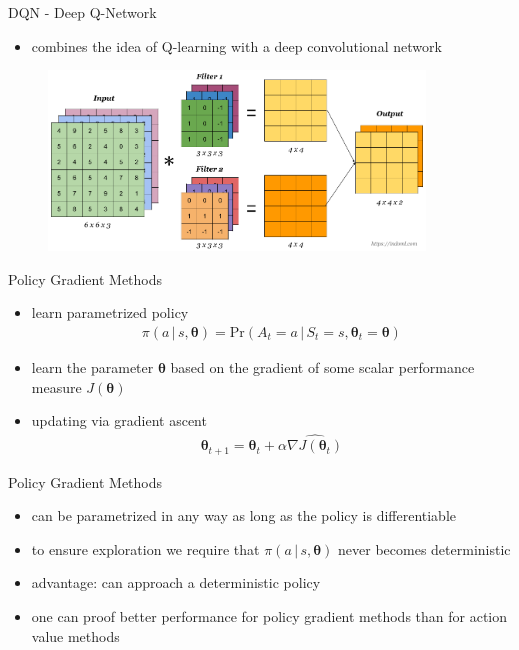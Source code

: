 \documentclass{beamer}
\begin{document}
\begin{frame}{DQN - Deep Q-Network}
\pause
\begin{itemize}
\item combines the idea of Q-learning with a deep convolutional network
\end{itemize}

\centering
\begin{figure}
\includegraphics[width = 10cm]{Images/convolution-with-multiple-filters2.png}
\end{figure}
\end{frame}
\begin{frame}{Policy Gradient Methods}
\pause
  \begin{itemize}
\item {learn parametrized policy
\begin{align*}
\pi(a\, |\, s, \boldsymbol{\theta}) = \mathrm{Pr}(A_t = a\,|\, S_t= s, \boldsymbol{\theta}_t = \boldsymbol{\theta})
\end{align*}}
\pause
\item learn the parameter $\boldsymbol{\theta}$ based on the gradient of some scalar performance measure $J(\boldsymbol{\theta})$
\pause
\item {updating via gradient ascent
\begin{align*}
\boldsymbol{\theta}_{t+1} = \boldsymbol{\theta}_t + \alpha \widehat{\nabla J(\boldsymbol{\theta}_t)}
\end{align*}}
  \end{itemize}
\end{frame}



\begin{frame}{Policy Gradient Methods}
\pause
\begin{itemize}
\item can be parametrized in any way as long as the policy is differentiable
\item to ensure exploration we require that $\pi(a\, |\, s, \boldsymbol{\theta})$ never becomes deterministic
\item {advantage: can approach a deterministic policy
}
\pause
\item one can proof better performance for policy gradient methods than for action value methods
\end{itemize}
\end{frame}
\end{document}
